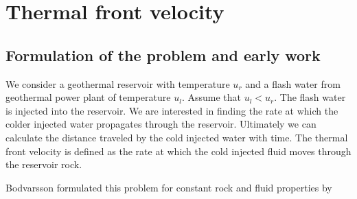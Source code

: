 %
%
%




\section{Thermal front velocity}
\subsection{Formulation of the problem and early work}
We consider a geothermal reservoir with temperature $u_{r}$  and a flash water from geothermal power plant of temperature $u_{l}$. Assume that $u_{l}<u_{r}$. The flash water is injected into the reservoir. We are interested in finding the rate at which the colder injected water propagates through the reservoir. Ultimately we can calculate the distance traveled by the cold injected water with time. The thermal front velocity is defined as the rate at which the cold injected fluid moves through the reservoir rock.

Bodvarsson formulated this problem for constant rock and fluid properties \cite{Bod-R72} by

